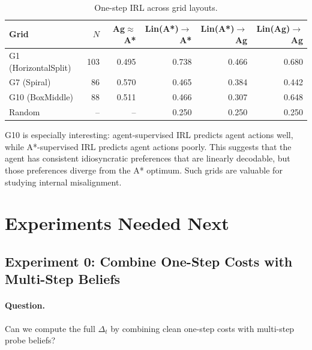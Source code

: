 \documentclass[11pt,a4paper]{article}
\begin{document}
\begin{table}[h]
\centering
\begin{tabular}{lrrrrr}
\toprule
Grid & $N$ & Ag$\approx$A* & Lin(A*)$\to$A* & Lin(A*)$\to$Ag & Lin(Ag)$\to$Ag \\
\midrule
G1 (HorizontalSplit) & 103 & 0.495 & 0.738 & 0.466 & 0.680 \\
G7 (Spiral) & 86 & 0.570 & 0.465 & 0.384 & 0.442 \\
G10 (BoxMiddle) & 88 & 0.511 & 0.466 & 0.307 & 0.648 \\
\midrule
Random & -- & -- & 0.250 & 0.250 & 0.250 \\
\bottomrule
\end{tabular}
\caption{One-step IRL across grid layouts.}
\label{tab:onestep-multigrid}
\end{table}

\begin{analysisbox}
G10 is especially interesting: agent-supervised IRL predicts agent actions well, while A*-supervised IRL predicts agent actions poorly. This suggests that the agent has consistent idiosyncratic preferences that are linearly decodable, but those preferences diverge from the A* optimum. Such grids are valuable for studying internal misalignment.
\end{analysisbox}

\section{Experiments Needed Next}

\subsection{Experiment 0: Combine One-Step Costs with Multi-Step Beliefs}

\paragraph{Question.} Can we compute the full $\Delta_t$ by combining clean one-step costs with multi-step probe beliefs?
\end{document}
